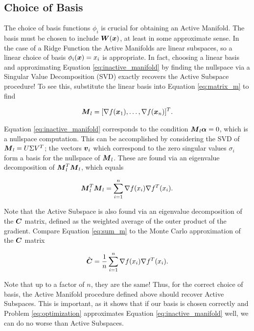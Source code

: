 \documentclass[]{aiaa-tc}%
\begin{document}
\subsection{Choice of Basis} \label{sec:basis}
The choice of basis functions $\phi_i$ is crucial for obtaining an Active Manifold. The basis must be chosen to include $\boldsymbol{W}(\boldsymbol{x})$, at least in some approximate sense. In the case of a Ridge Function the Active Manifolds are linear subspaces, so a linear choice of basis $\phi_i(\boldsymbol{x}) = x_i$ is appropriate. In fact, choosing a linear basis and approximating Equation \ref{eq:inactive_manifold} by finding the nullspace via a Singular Value Decomposition (SVD) exactly recovers the Active Subspace procedure! To see this, substitute the linear basis into Equation \ref{eq:matrix_m} to find

\begin{equation}
\label{eq:matrix_m_linear}
\boldsymbol{M}_l = [\nabla f(\boldsymbol{x}_1),\dots,\nabla f(\boldsymbol{x}_n)]^T.
\end{equation}

Equation \ref{eq:inactive_manifold} corresponds to the condition $\boldsymbol{M}_l\boldsymbol{\alpha}=0$, which is a nullspace computation. This can be accomplished by considering the SVD of $\boldsymbol{M}_l=U\Sigma V^T$; the vectors $\boldsymbol{v}_i$ which correspond to the zero singular values $\sigma_i$ form a basis for the nullspace of $\boldsymbol{M}_l$. These are found via an eigenvalue decomposition of $\boldsymbol{M}_l^T\boldsymbol{M}_l$, which equals

\begin{equation}
\label{eq:sum_m}
\boldsymbol{M}_l^T\boldsymbol{M}_l = \sum_{i=1}^n \nabla f(x_i) \nabla f^T(x_i).
\end{equation}

Note that the Active Subspace is also found via an eigenvalue decomposition of the $\boldsymbol{C}$ matrix, defined as the weighted average of the outer product of the gradient.\cite{constantine2015} Compare Equation \ref{eq:sum_m} to the Monte Carlo approximation of the $\boldsymbol{C}$ matrix

\begin{equation}
\label{eq:sum_c}
\hat{\boldsymbol{C}} = \frac{1}{n} \sum_{i=1}^n \nabla f(x_i) \nabla f^T(x_i).
\end{equation}

Note that up to a factor of $n$, they are the same! Thus, for the correct choice of basis, the Active Manifold procedure defined above should recover Active Subspaces. This is important, as it shows that if our basis is chosen correctly and Problem \ref{eq:optimization} approximates Equation \ref{eq:inactive_manifold} well, we can do no worse than Active Subspaces.
\end{document}
